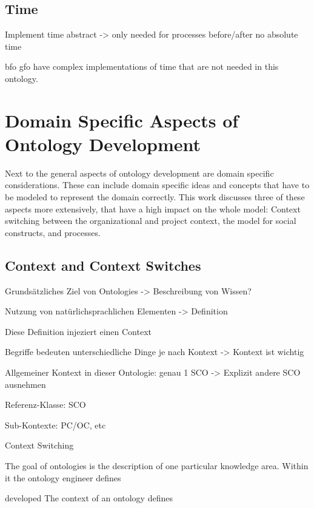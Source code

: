 \documentclass[a4paper, DIV=13, BCOR=0cm]{scrbook}
\begin{document}
\subsection{Time}
\label{time}
Implement time abstract -> only needed for processes before/after
no absolute time

\gls{bfo} \gls{gfo} have complex implementations of time that are not needed in this ontology.

\section{Domain Specific Aspects of Ontology Development }
\label{domain-aspects}
Next to the general aspects of ontology development are domain specific considerations. These can include domain specific ideas and concepts that have to be modeled to represent the domain correctly. This work discusses three of these aspects more extensively, that have a high impact on the whole model: Context switching between the organizational and project context, the model for social constructs, and processes.

\subsection{Context and Context Switches }
\begin{compactenum}
	\item Grundsätzliches Ziel von Ontologies -> Beschreibung von Wissen?
	\item Nutzung von natürlichsprachlichen Elementen -> Definition
	\item Diese Definition injeziert einen Context
	\item Begriffe bedeuten unterschiedliche Dinge je nach Kontext -> Kontext ist wichtig
	\item Allgemeiner Kontext in dieser Ontologie: genau 1 SCO -> Explizit andere SCO ausnehmen
	\item Referenz-Klasse: SCO
	\item Sub-Kontexte: PC/OC, etc
	\item Context Switching
\end{compactenum}

The goal of ontologies is the description of one particular knowledge area. Within it the ontology engineer defines 

developed The context of an ontology defines 
\end{document}
